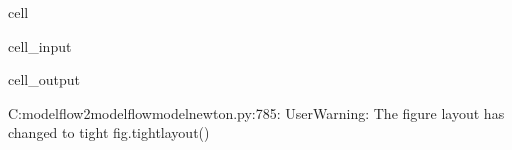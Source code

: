 \documentclass[letterpaper,10pt,english]{jupyterBook}
\begin{document}
\begin{sphinxuseclass}{cell}\begin{sphinxVerbatimInput}

\begin{sphinxuseclass}{cell_input}
\begin{sphinxVerbatim}[commandchars=\\\{\}]
      
\end{sphinxVerbatim}

\end{sphinxuseclass}\end{sphinxVerbatimInput}
\begin{sphinxVerbatimOutput}

\begin{sphinxuseclass}{cell_output}
\begin{sphinxVerbatim}[commandchars=\\\{\}]
C:\PYGZbs{}modelflow2\PYGZbs{}modelflow\PYGZbs{}modelnewton.py:785: UserWarning: The figure layout has changed to tight
  fig.tight\PYGZus{}layout()
\end{sphinxVerbatim}

\noindent{}

\end{sphinxuseclass}\end{sphinxVerbatimOutput}

\end{sphinxuseclass}
\end{document}
